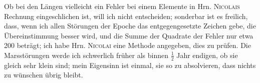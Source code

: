 \par{}Ob bei den Längen vielleicht ein Fehler bei einem Elemente in Hrn. \textsc{Nicolais} Rechnung eingeschlichen ist, will ich nicht entscheiden; sonderbar ist es freilich, dass, wenn ich allen Störungen der Epoche das entgegengesetzte Zeichen gebe, die Übereinstimmung  besser wird, und die Summe der Quadrate der Fehler nur etwa 200 beträgt; ich habe Hrn. \textsc{Nicolai} eine Methode angegeben, dies zu prüfen. Die Marsstörungen werde ich schwerlich früher als binnen \(\frac{1}{2}\) Jahr endigen, ob sie gleich sehr klein sind; mein Eigensinn ist einmal, sie so zu absolvieren, dass nichts zu wünschen übrig bleibt.
\par
